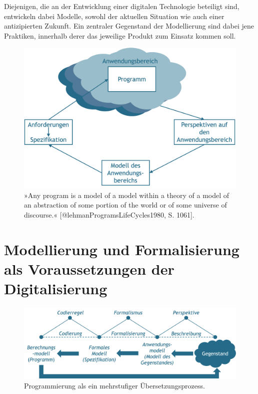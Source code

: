 \documentclass[
  a4paper,
]{book}
\begin{document}
Diejenigen, die an der Entwicklung einer digitalen Technologie beteiligt sind, entwickeln dabei Modelle, sowohl der aktuellen Situation wie auch einer antizipierten Zukunft. Ein zentraler Gegenstand der Modellierung sind dabei jene Praktiken, innerhalb derer das jeweilige Produkt zum Einsatz kommen soll.

\begin{figure}

{\centering \includegraphics[width=0.75\linewidth]{Figures/09-01-Modellbildung} 

}

\caption{»Any program is a model of a model within a theory of a model of an abstraction of some portion of the world or of some universe of discourse.« [@lehmanProgramsLifeCycles1980, S. 1061].}\label{fig:fig12}
\end{figure}

\section{Modellierung und Formalisierung als Voraussetzungen der Digitalisierung}\label{modellierung-und-formalisierung-als-voraussetzungen-der-digitalisierung}

\begin{figure}

{\centering \includegraphics{Figures/09-02-InformatischeModellbildung} 

}

\caption{Programmierung als ein mehrstufiger Übersetzungsprozess.}\label{fig:fig13}
\end{figure}
\end{document}
